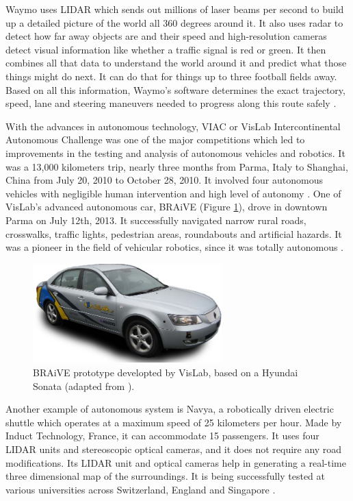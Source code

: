Waymo uses LIDAR which sends out millions of laser beams per second to build up a detailed picture of the world all 360 degrees around it. It also uses radar to detect how far away objects are and their speed and high-resolution cameras detect visual information like whether a traffic signal is red or green. It then combines all that data to understand the world around it and predict what those things might do next. It can do that for things up to three football fields away. Based on all this information, Waymo's software determines the exact trajectory, speed, lane and steering maneuvers needed to progress along this route safely \cite{waymoh} \cite{waymot}.

With the advances in autonomous technology, VIAC or VisLab Intercontinental Autonomous Challenge was one of the major competitions which led to improvements in the testing and analysis of autonomous vehicles and robotics. It was a 13,000 kilometers trip, nearly three months from Parma, Italy to Shanghai, China from July 20, 2010 to October 28, 2010. It involved four autonomous vehicles with negligible human intervention and high level of autonomy \cite{Broggi2010}. One of VisLab's advanced autonomous car, BRAiVE (Figure \ref{fig:veiculos4}), drove in downtown Parma on July 12th, 2013. It successfully navigated narrow rural roads, crosswalks, traffic lights, pedestrian areas, roundabouts and artificial hazards. It was a pioneer in the field of vehicular robotics, since it was totally autonomous \cite{Broggi2013}.
\begin{figure}[!h]
	\centering
	\includegraphics[width=0.65\textwidth]{./figure/veiculos4.png}
	\caption{BRAiVE prototype developted by VisLab, based on a Hyundai Sonata (adapted from \cite{Broggi2013}).}
	\label{fig:veiculos4}
\end{figure}

Another example of autonomous system is Navya, a robotically driven electric shuttle which operates at a maximum speed of 25 kilometers per hour. Made by Induct Technology, France, it can accommodate 15 passengers. It uses four LIDAR units and stereoscopic optical cameras, and it does not
require any road modifications. Its LIDAR unit and
optical cameras help in generating a real-time three dimensional map of the surroundings. It is being successfully tested at various universities across Switzerland, England and Singapore \cite{Zhang2014}.

